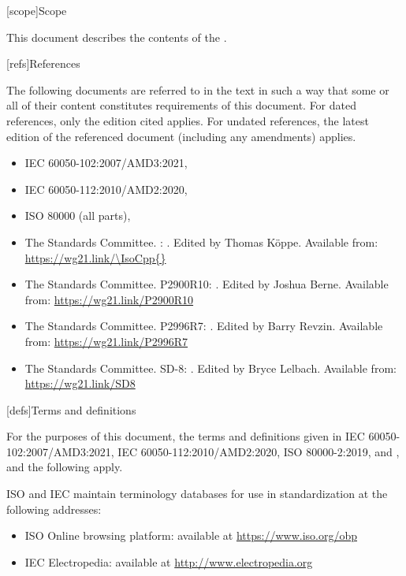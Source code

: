 

[scope]{Scope}

\pnum
{}%
This document describes the contents of the .


[refs]{References}

\pnum
{}%
The following documents are referred to in the text
in such a way that some or all of their content
constitutes requirements of this document.
For dated references, only the edition cited applies.
For undated references,
the latest edition of the referenced document
(including any amendments) applies.
\begin{itemize}
\item
IEC 60050-102:2007/AMD3:2021,
\item
IEC 60050-112:2010/AMD2:2020,
\item
ISO 80000 (all parts), 
\item
The \Cpp{} Standards Committee.
\IsoCpp{}: .
Edited by Thomas K\"{o}ppe.
Available from: \url{https://wg21.link/\IsoCpp{}}
\item
The \Cpp{} Standards Committee.
P2900R10: .
Edited by Joshua Berne.
Available from: \url{https://wg21.link/P2900R10}
\item
The \Cpp{} Standards Committee.
P2996R7: .
Edited by Barry Revzin.
Available from: \url{https://wg21.link/P2996R7}
\item
The \Cpp{} Standards Committee.
SD-8: .
Edited by Bryce Lelbach.
Available from: \url{https://wg21.link/SD8}
\end{itemize}


[defs]{Terms and definitions}

\pnum
{}%
For the purposes of this document,
the terms and definitions given in
IEC 60050-102:2007/AMD3:2021,
IEC 60050-112:2010/AMD2:2020,
ISO 80000-2:2019,
and
\IsoCpp{},
and the following apply.

\pnum
ISO and IEC maintain terminology databases
for use in standardization
at the following addresses:
\begin{itemize}
\item ISO Online browsing platform: available at \url{https://www.iso.org/obp}
\item IEC Electropedia: available at \url{http://www.electropedia.org}
\end{itemize}


